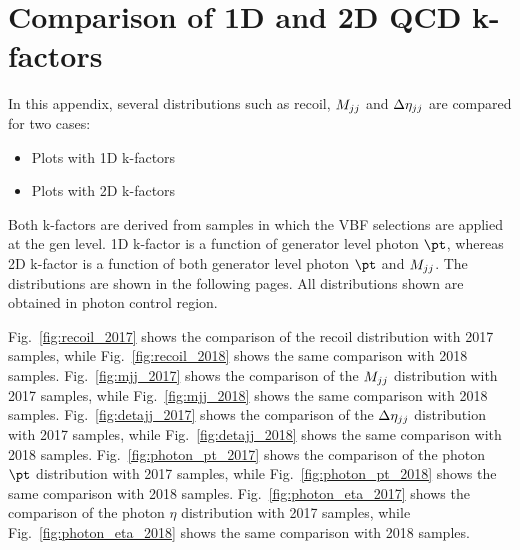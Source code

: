 \section{Comparison of 1D and 2D QCD k-factors}
\label{sec:1d_vs_2d_kfac}

In this appendix, several distributions such as recoil, $M_{jj}$ and $\Delta \eta_{jj}$ are compared for two cases:

\begin{itemize}
    \item Plots with 1D k-factors
    \item Plots with 2D k-factors
\end{itemize}

Both k-factors are derived from samples in which the VBF selections are applied at the gen level. 1D k-factor is a function of
generator level photon $\pt$, whereas 2D k-factor is a function of both generator level photon $\pt$ and $M_{jj}$. 
The distributions are shown in the following pages. All distributions shown are obtained in photon control region.

Fig.~\ref{fig:recoil_2017} shows the comparison of the recoil distribution 
with 2017 samples, while Fig.~\ref{fig:recoil_2018} shows the same comparison with 2018 samples. 
Fig.~\ref{fig:mjj_2017} shows the comparison of the $M_{jj}$ distribution 
with 2017 samples, while Fig.~\ref{fig:mjj_2018} shows the same comparison with 2018 samples. 
Fig.~\ref{fig:detajj_2017} shows the comparison of the $\Delta \eta_{jj}$ distribution 
with 2017 samples, while Fig.~\ref{fig:detajj_2018} shows the same comparison with 2018 samples. 
Fig.~\ref{fig:photon_pt_2017} shows the comparison of the photon $\pt$ distribution 
with 2017 samples, while Fig.~\ref{fig:photon_pt_2018} shows the same comparison with 2018 samples. 
Fig.~\ref{fig:photon_eta_2017} shows the comparison of the photon $\eta$ distribution 
with 2017 samples, while Fig.~\ref{fig:photon_eta_2018} shows the same comparison with 2018 samples. 

